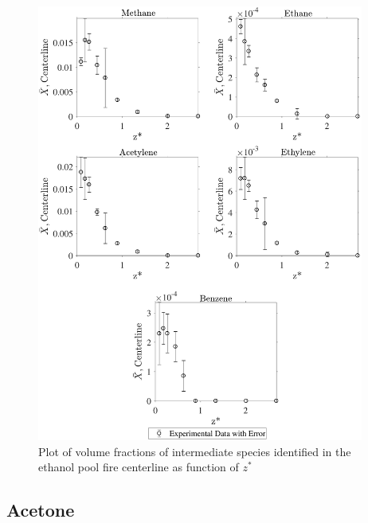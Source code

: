 \documentclass[12pt]{article}
\begin{document}
\begin{figure}[!h]
	\centering
\includegraphics[width=10.75cm,keepaspectratio]{Ethanol_Inter_MOL_FRAC_Plot.pdf}
	\caption[Volume fractions of intermediate species in the ethanol plume]{Plot of volume fractions of intermediate species identified in the ethanol pool fire centerline as function of $z^{*}$}
	\label{fig:Ethanol_VOL_Frac_Inter}
\end{figure}


\pagebreak
\subsection{Acetone}
\label{ssec:Acetonel_ALL_Vol_Frac}
\end{document}
